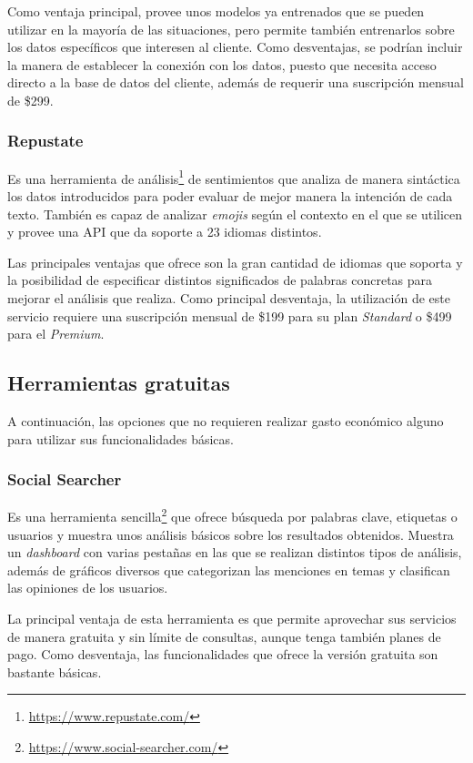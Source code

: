 Como ventaja principal, provee unos modelos ya entrenados que se pueden utilizar en la mayoría de las situaciones, pero permite también entrenarlos sobre los datos específicos que interesen al cliente. Como desventajas, se podrían incluir la manera de establecer la conexión con los datos, puesto que necesita acceso directo a la base de datos del cliente, además de requerir una suscripción mensual de \$299.

\subsubsection{Repustate}

Es una herramienta de análisis\footnote{\url{https://www.repustate.com/}} de sentimientos que analiza de manera sintáctica los datos introducidos para poder evaluar de mejor manera la intención de cada texto. También es capaz de analizar \textit{emojis} según el contexto en el que se utilicen y provee una API que da soporte a 23 idiomas distintos.

Las principales ventajas que ofrece son la gran cantidad de idiomas que soporta y la posibilidad de especificar distintos significados de palabras concretas para mejorar el análisis que realiza. Como principal desventaja, la utilización de este servicio requiere una suscripción mensual de \$199 para su plan \textit{Standard} o \$499 para el \textit{Premium}.

\subsection{Herramientas gratuitas}

A continuación, las opciones que no requieren realizar gasto económico alguno para utilizar sus funcionalidades básicas.

\subsubsection{Social Searcher}

Es una herramienta sencilla\footnote{\url{https://www.social-searcher.com/}} que ofrece búsqueda por palabras clave, etiquetas o usuarios y muestra unos análisis básicos sobre los resultados obtenidos. Muestra un \textit{dashboard} con varias pestañas en las que se realizan distintos tipos de análisis, además de gráficos diversos que categorizan las menciones en temas y clasifican las opiniones de los usuarios.

La principal ventaja de esta herramienta es que permite aprovechar sus servicios de manera gratuita y sin límite de consultas, aunque tenga también planes de pago. Como desventaja, las funcionalidades que ofrece la versión gratuita son bastante básicas. 

